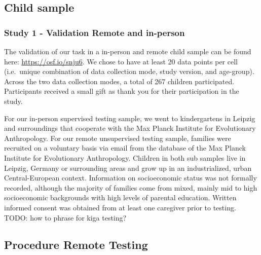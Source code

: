 \documentclass[
  english,
  man,floatsintext]{apa6}
\begin{document}
\hypertarget{child-sample}{%
\subsection{Child sample}\label{child-sample}}

\hypertarget{study-1---validation-remote-and-in-person}{%
\subsubsection{Study 1 - Validation Remote and in-person}\label{study-1---validation-remote-and-in-person}}

The validation of our task in a in-person and remote child sample can be found here: \url{https://osf.io/snju6}.
We chose to have at least 20 data points per cell (i.e.~unique combination of data collection mode, study version, and age-group). Across the two data collection modes, a total of 267 children participated. Participants received a small gift as thank you for their participation in the study.

For our in-person supervised testing sample, we went to kindergartens in Leipzig and surroundings that cooperate with the Max Planck Institute for Evolutionary Anthropology. For our remote unsupervised testing sample, families were recruited on a voluntary basis via email from the database of the Max Planck Institute for Evolutionary Anthropology. Children in both sub samples live in Leipzig, Germany or surrounding areas and grow up in an industrialized, urban Central-European context. Information on socioeconomic status was not formally recorded, although the majority of families come from mixed, mainly mid to high socioeconomic backgrounds with high levels of parental education.
Written informed consent was obtained from at least one caregiver prior to testing.
TODO: how to phrase for kiga testing?

\hypertarget{procedure-remote-testing}{%
\subsection{Procedure Remote Testing}\label{procedure-remote-testing}}
\end{document}
